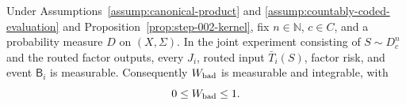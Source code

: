 \begin{lemma}
\label{lem:step-005-measurable-bad-mass}
Under Assumptions~\ref{assump:canonical-product} and
\ref{assump:countably-coded-evaluation} and
Proposition~\ref{prop:step-002-kernel}, fix \(n\in\mathbb N\), \(c\in C\),
and a probability measure \(D\) on \((X,\Sigma)\).  In the joint experiment
consisting of \(S\sim D_c^n\) and the routed factor outputs, every
\(J_i\), routed input \(\bar T_i(S)\), factor risk, and event
\(\mathsf B_i\) is measurable.  Consequently \(W_{\rm bad}\) is
measurable and integrable, with
\begin{equation}\label{eq:step-005-bad-mass-range}
0\le W_{\rm bad}\le1.
\end{equation}
\end{lemma}

